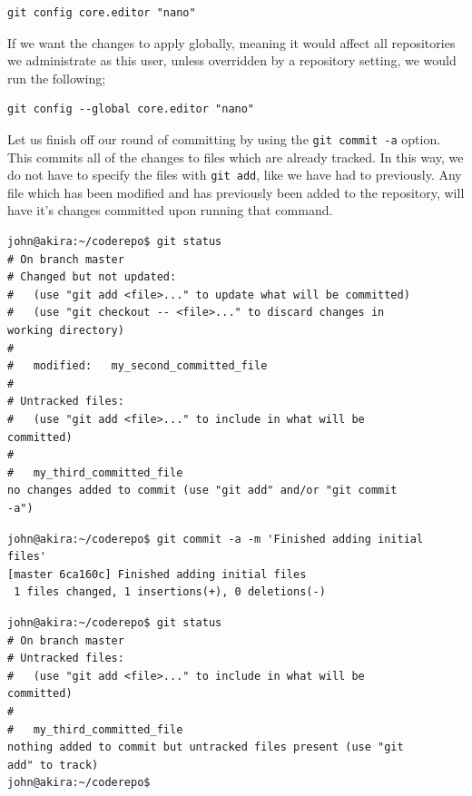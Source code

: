 \begin{Verbatim}[frame=single,fontsize=\relsize{-3}] 
git config core.editor "nano"
\end{Verbatim}

If we want the changes to apply globally, meaning it would affect all repositories we administrate as this user, unless overridden by a repository setting, we would run the following;

\begin{Verbatim}[frame=single,fontsize=\relsize{-3}] 
git config --global core.editor "nano"
\end{Verbatim}

Let us finish off our round of committing by using the \texttt{git commit -a} option.  This commits all of the changes to files which are already tracked.  In this way, we do not have to specify the files with \texttt{git add}, like we have had to previously.  Any file which has been modified and has previously been added to the repository, will have it's changes committed upon running that command.

\begin{Verbatim}[frame=single,fontsize=\relsize{-3}] 
john@akira:~/coderepo$ git status 
# On branch master 
# Changed but not updated: 
#   (use "git add <file>..." to update what will be committed) 
#   (use "git checkout -- <file>..." to discard changes in 
working directory) 
# 
#	modified:   my_second_committed_file 
# 
# Untracked files: 
#   (use "git add <file>..." to include in what will be 
committed) 
# 
#	my_third_committed_file 
no changes added to commit (use "git add" and/or "git commit 
-a")
\end{Verbatim} 

\begin{Verbatim}[frame=single,fontsize=\relsize{-3}] 
john@akira:~/coderepo$ git commit -a -m 'Finished adding initial 
files' 
[master 6ca160c] Finished adding initial files 
 1 files changed, 1 insertions(+), 0 deletions(-) 
\end{Verbatim} 

\begin{Verbatim}[frame=single,fontsize=\relsize{-3}] 
john@akira:~/coderepo$ git status 
# On branch master 
# Untracked files: 
#   (use "git add <file>..." to include in what will be 
committed) 
# 
#	my_third_committed_file 
nothing added to commit but untracked files present (use "git 
add" to track) 
john@akira:~/coderepo$ 
\end{Verbatim} 

